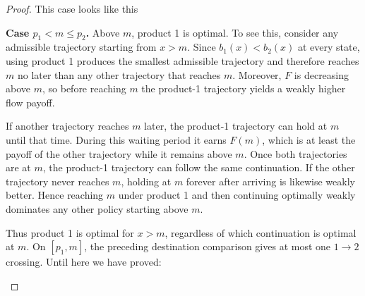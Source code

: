\documentclass[11pt]{article}
\begin{document}
\begin{proof}
This case looks like this 

\begin{figure}[H]
\centering
{}
\end{figure}

\medskip\noindent\textbf{Case $p_1<m\le p_2$.}
Above $m$, product 1 is optimal. To see this, consider any admissible trajectory starting from $x>m$. Since $b_1(x)<b_2(x)$ at every state, using product 1 produces the smallest admissible trajectory and therefore reaches $m$ no later than any other trajectory that reaches $m$. Moreover, $F$ is decreasing above $m$, so before reaching $m$ the product-1 trajectory yields a weakly higher flow payoff.

If another trajectory reaches $m$ later, the product-1 trajectory can hold at $m$ until that time. During this waiting period it earns $F(m)$, which is at least the payoff of the other trajectory while it remains above $m$. Once both trajectories are at $m$, the product-1 trajectory can follow the same continuation. If the other trajectory never reaches $m$, holding at $m$ forever after arriving is likewise weakly better. Hence reaching $m$ under product 1 and then continuing optimally weakly dominates any other policy starting above $m$.

Thus product 1 is optimal for $x>m$, regardless of which continuation is optimal at $m$. On $[p_1,m]$, the preceding destination comparison gives at most one $1\to2$ crossing. Until here we have proved: 

\begin{figure}[H]
\centering
{}
\end{figure}


\end{proof}
\end{document}
